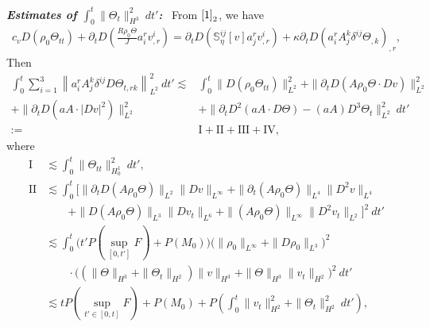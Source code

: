 \documentclass[12pt,a4paper]{amsart}
\numberwithin{equation}{section}
\theoremstyle{plain}
\theoremstyle{definition}
\begin{document}
\vspace{0.3cm}
\textsl{\textbf{Estimates of $\int_{0}^{t}\| \Theta_t\|_{H^3}^2\ dt'$:}}~
From $\eqref{1}_2$, we have
\begin{align*}
c_vD(\rho_0 \Theta_{tt})+\partial_t D \left( \frac{R\rho_0\Theta}{J}a^r_iv^i_{,r}\right)=\partial_t D(\mathbb{S}_{\eta}^{ij}[v]a^r_jv^i_{,r})+\kappa \partial_t D (a^r_i A^k_j \delta^{ij}\Theta_{,k})_{,r},
\end{align*}
Then
\begin{align*}
\int_{0}^{t}\sum\limits_{i=1}^3\left\|a^r_i A^k_j \delta^{ij} D\Theta_{t,rk} \right\|_{L^2}^2 \ dt'
\lesssim & \int_{0}^{t} \|D(\rho_0 \Theta_{tt})\|_{L^2}^2
   +\| \partial_t D(A\rho_0\Theta\cdot Dv)\|_{L^2}^2\\
   +\| \partial_t D(a A \cdot |Dv|^2)\|_{L^2}^2&
   +\|\partial_t D^2(aA\cdot D\Theta)-(aA) D^3 \Theta_t\|_{L^2}^2\ dt'\\
:=&\mathrm{I}+\mathrm{II}+\mathrm{III} +\mathrm{IV},
\end{align*}
where
\begin{align*}
\mathrm{I}&\lesssim  \int_{0}^{t} \|\Theta_{tt}\|_{H_0^1}^2\ dt',\\
\mathrm{II}&\lesssim \int_{0}^{t} \Big[ 
    \|\partial_t D(A\rho_0\Theta)\|_{L^2} \|Dv\|_{L^{\infty}}
    +\|\partial_t (A\rho_0\Theta)\|_{L^4}\|D^2v\|_{L^4}\\
     &\qquad+ \| D(A\rho_0\Theta)\|_{L^3} \|Dv_t\|_{L^6}
     +\| (A\rho_0\Theta)\|_{L^{\infty}}\|D^2v_t\|_{L^2} \Big]^2 \ dt'\\
&\lesssim \int_{0}^{t} \Big( t'P(\sup\limits_{[0,t']}F)+P(M_0)  \Big)
     \Big(\|\rho_0\|_{L^{\infty}}+\|D\rho_0\|_{L^3}\Big)^2\\
&\qquad\cdot\Big((\|\Theta\|_{H^3}+\|\Theta_t\|_{H^2})\|v\|_{H^3}
      +\|\Theta\|_{H^3}\|v_t\|_{H^2}\Big)^2\ dt'\\
&\lesssim tP(\sup\limits_{t'\in[0,t]}F)+P(M_0)
     +P\left(\int_{0}^{t}\|v_t\|_{H^2}^2+\|\Theta_t\|_{H^2}^2 \ dt'\right),
\end{align*}
\end{document}
